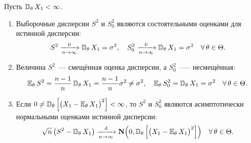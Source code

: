 \begin{thm*}
    Пусть $\mathbb{D}_{\theta}\, X_{1}<\infty$.
    \begin{enumerate}
        \item Выборочные дисперсии $S^{2}$ и $S^{2}_0$ являются состоятельными оценками для истинной дисперсии:
            \begin{equation*}
                S^{2} \xrightarrow[n \to \infty]{\text{p}} \mathbb{D}_{\theta}\, X_{1}=\sigma^{2}, \quad S_{0}^{2} \xrightarrow[n \to \infty]{\text{p}} \mathbb{D}_{\theta}\, X_{1}=\sigma^{2} \quad \forall \, \theta \in \Theta.
            \end{equation*}
        \item Величина $S^{2}$~--- смещённая оценка дисперсии, а $S^{2}_0$~--— несмещённая:
            \begin{equation*}
                \mathbb{E}_{\theta}\, S^{2}=\frac{n-1}{n} \, \mathbb{D}_{\theta}\, X_{1}=\frac{n-1}{n} \sigma^{2} \neq \sigma^{2}, \quad \mathbb{E}_{\theta}\,  S_{0}^{2}=\mathbb{D}_{\theta}\,  X_{1}=\sigma^{2} \quad \forall \, \theta \in \Theta.
            \end{equation*}
        \item Если $0 \neq \mathbb{D}_{\theta}\, \Bigl[ \bigl(X_{1}-\mathbb{E}_{\theta}\, X_{1}\bigr)^{2} \Bigr] <\infty$, то $S^{2}$ и $S^{2}_0$ являются асимптотически нормальными оценками истинной дисперсии:
            \begin{equation*}
                \sqrt{n}\left(S^{2}-\mathbb{D}_{\theta}\,  X_{1}\right) \xrightarrow[n \to \infty]{\text{d}} \mathbf{N}\Bigl(0, \mathbb{D}_{\theta}\, \Bigl[\bigl(X_{1}-\mathbb{E}_{\theta}\,  X_{1}\bigr)^{2} \Bigr] \Bigr) \quad \forall \, \theta \in \Theta.
            \end{equation*}
    \end{enumerate}
\end{thm*}

